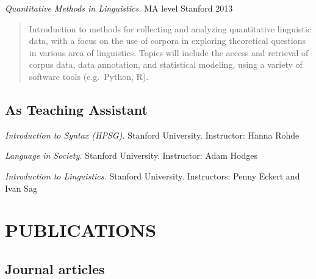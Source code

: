 \documentclass[11pt,]{article}
\begin{document}
\emph{Quantitative Methods in Linguistics.} MA level \hfill Stanford
2013

\begin{quote}
Introduction to methods for collecting and analyzing quantitative
linguistic data, with a focus on the use of corpora in exploring
theoretical questions in various area of linguistics. Topics will
include the access and retrieval of corpus data, data annotation, and
statistical modeling, using a variety of software tools (e.g.~Python,
R).
\end{quote}

\subsection{As Teaching Assistant}\label{as-teaching-assistant}

\emph{Introduction to Syntax (HPSG).} Stanford University. Instructor:
Hanna Rohde

\emph{Language in Society.} Stanford University. Instructor: Adam Hodges

\emph{Introduction to Linguistics.} Stanford University. Instructors:
Penny Eckert and Ivan Sag

\section{PUBLICATIONS}\label{publications}

\subsection{Journal articles}\label{journal-articles}
\end{document}
